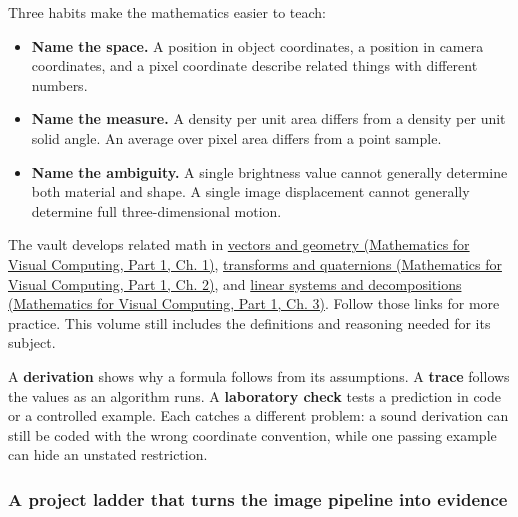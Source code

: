 Three habits make the mathematics easier to teach:

\begin{itemize}
\tightlist
\item
  \textbf{Name the space.} A position in object coordinates, a position in camera coordinates, and a pixel coordinate describe related things with different numbers.
\item
  \textbf{Name the measure.} A density per unit area differs from a density per unit solid angle. An average over pixel area differs from a point sample.
\item
  \textbf{Name the ambiguity.} A single brightness value cannot generally determine both material and shape. A single image displacement cannot generally determine full three-dimensional motion.
\end{itemize}

The vault develops related math in \href{../02-Mathematics-for-Visual-Computing-P01/main.pdf\#nameddest=01-foundations-i-ch017-the-panel-gives-us-a-reason-to-learn}{vectors and geometry (Mathematics for Visual Computing, Part 1, Ch. 1)}, \href{../02-Mathematics-for-Visual-Computing-P01/main.pdf\#nameddest=01-foundations-i-ch018-keep-the-promises-visible-while-moving-between-representations}{transforms and quaternions (Mathematics for Visual Computing, Part 1, Ch. 2)}, and \href{../02-Mathematics-for-Visual-Computing-P01/main.pdf\#nameddest=01-foundations-i-ch019-the-graphics-problem-hiding-inside-a-matrix-equation}{linear systems and decompositions (Mathematics for Visual Computing, Part 1, Ch. 3)}. Follow those links for more practice. This volume still includes the definitions and reasoning needed for its subject.

A \textbf{derivation} shows why a formula follows from its assumptions. A \textbf{trace} follows the values as an algorithm runs. A \textbf{laboratory check} tests a prediction in code or a controlled example. Each catches a different problem: a sound derivation can still be coded with the wrong coordinate convention, while one passing example can hide an unstated restriction.

\subsubsection{A project ladder that turns the image pipeline into evidence}\label{03-visual-computing-i-ch001-a-project-ladder-that-turns-the-image-pipeline-into-evidence}

\hypertarget{03-visual-computing-i-ch001-a-project-ladder-that-turns-the-image-pipeline-into-evidence}{}

